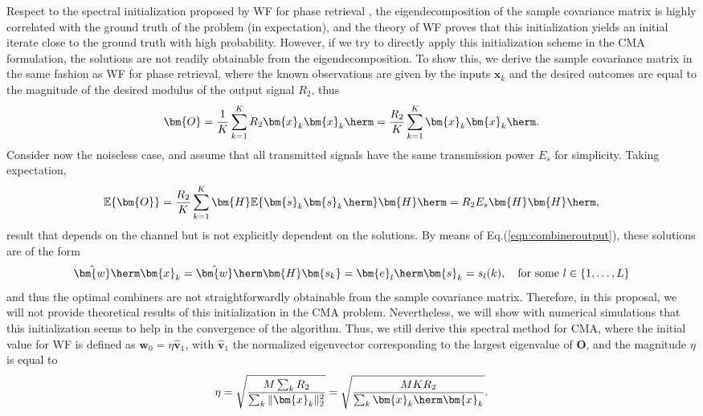 Respect to the spectral initialization proposed by WF for phase retrieval \cite{Candes2015a_phaseretrievalWF}, the eigendecomposition of the sample covariance matrix is highly correlated with the ground truth of the problem (in expectation), and the theory of WF proves that this initialization yields an initial iterate close to the ground truth with high probability. However, if we try to directly apply this initialization scheme in the CMA formulation, the solutions are not readily obtainable from the eigendecomposition. To show this, we derive the sample covariance matrix in the same fashion as WF for phase retrieval, where the known observations are given by the inputs $\bm{x}_k$ and the desired outcomes are equal to the magnitude of the desired modulus of the output signal $R_2$, thus
\begin{equation}
\bm{O}=\frac{1}{K}\sum_{k=1}^KR_2\bm{x}_k\bm{x}_k\herm=\frac{R_2}{K}\sum_{k=1}^K\bm{x}_k\bm{x}_k\herm.
\end{equation}
Consider now the noiseless case, and assume that all transmitted signals have the same transmission power $E_s$ for simplicity.  Taking expectation,
\begin{equation}
\mathbb{E}\{\bm{O}\}=\frac{R_2}{K}\sum_{k=1}^K\bm{H}\mathbb{E}\{\bm{s}_k\bm{s}_k\herm\}\bm{H}\herm=R_2E_s\bm{H}\bm{H}\herm,
\end{equation}
result that depends on the channel but is not explicitly dependent on the solutions. By means of Eq.(\ref{eqn:combineroutput}), these solutions are of the form
\begin{equation}
	\hat{\bm{w}}\herm\bm{x}_k=\hat{\bm{w}}\herm\bm{H}\bm{s_k}=\bm{e}_{l}\herm\bm{s}_k=s_l(k),\quad\text{for some } l\in\{1,\ldots,L\}
\end{equation}
and thus the optimal combiners 
are not straightforwardly obtainable from the sample covariance matrix. Therefore, in this proposal, we will not provide theoretical results of this initialization in the CMA problem. 
Nevertheless, we will show with numerical simulations that this initialization seems to help in the convergence of the algorithm. Thus, we still derive this spectral method for CMA, where the initial value for WF is defined as $\bm{w}_0=\eta\hat{\bm{v}}_1$, with $\hat{\bm{v}}_1$ the normalized eigenvector corresponding to the largest eigenvalue of $\bm{O}$, and the magnitude $\eta$ is equal to
\begin{equation}
\eta=\sqrt{\frac{M\sum_{k}R_2}{\sum_k \|\bm{x}_k\|_2^2}}=\sqrt{\frac{MKR_2}{\sum_k \bm{x}_k\herm\bm{x}_k}}.
\end{equation}


